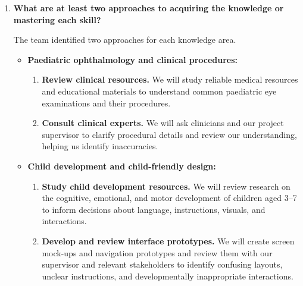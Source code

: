 \documentclass[12pt]{article}
\begin{document}
\begin{enumerate}
\begin{itemize}
        \item \textbf{Educational game design:}
        We need to design interactive activities that reinforce learning
        objectives and familiarize children with ophthalmology procedures.
        This includes selecting appropriate game mechanics, feedback,
        and rewards that support learning while maintaining engagement.
    \end{itemize}

    These areas cover the clinical, developmental, technical, and
    educational needs of the project. Each team member will select
    at least one area based on their experience, responsibilities,
    and learning goals, and describe their plans for developing
    the relevant knowledge or skills.

    \item \textbf{What are at least two approaches to acquiring the
    knowledge or mastering each skill?}

    The team identified two approaches for each knowledge area.

    \begin{itemize}
        \item \textbf{Paediatric ophthalmology and clinical procedures:}
        \begin{enumerate}
            \item \textbf{Review clinical resources.}
            We will study reliable medical resources and educational
            materials to understand common paediatric eye examinations
            and their procedures.

            \item \textbf{Consult clinical experts.}
            We will ask clinicians and our project supervisor to clarify
            procedural details and review our understanding, helping
            us identify inaccuracies.
        \end{enumerate}

        \item \textbf{Child development and child-friendly design:}
        \begin{enumerate}
            \item \textbf{Study child development resources.}
            We will review research on the cognitive, emotional, and
            motor development of children aged 3--7 to inform decisions
            about language, instructions, visuals, and interactions.

            \item \textbf{Develop and review interface prototypes.}
            We will create screen mock-ups and navigation prototypes
            and review them with our supervisor and relevant stakeholders
            to identify confusing layouts, unclear instructions, and
            developmentally inappropriate interactions.
        \end{enumerate}


\end{itemize}
\end{enumerate}
\end{document}

